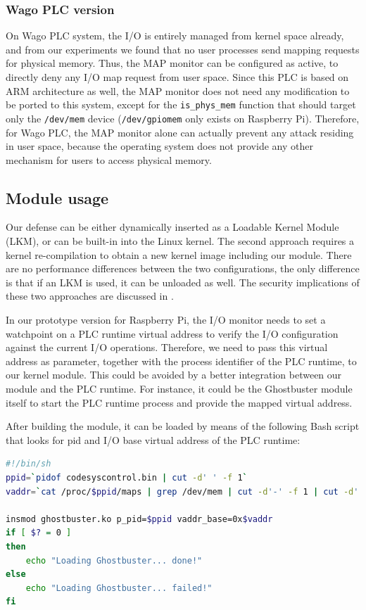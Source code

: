 \subsubsection{Wago PLC version}

On Wago PLC system, the I/O is entirely managed from kernel space already, and from our experiments we found that no user processes send mapping requests for physical memory.
Thus, the MAP monitor can be configured as active, to directly deny any I/O map request from user space.
Since this PLC is based on ARM architecture as well, the MAP monitor does not need any modification to be ported to this system,
except for the \verb|is_phys_mem| function that should target only the \verb|/dev/mem| device (\verb|/dev/gpiomem| only exists on Raspberry Pi).
Therefore, for Wago PLC, the MAP monitor alone can actually prevent any attack residing in user space, because the operating system does not provide
any other mechanism for users to access physical memory.


\subsection{Module usage}
\label{sec:def-usage}

Our defense can be either dynamically inserted as a Loadable Kernel Module (LKM), or can be built-in into the Linux kernel.
The second approach requires a kernel re-compilation to obtain a new kernel image including our module.
There are no performance differences between the two configurations, the only difference is that if an LKM is used, it can be unloaded as well.
The security implications of these two approaches are discussed in .

In our prototype version for Raspberry Pi, the I/O monitor needs to set a watchpoint on a PLC runtime virtual address to verify the I/O configuration
against the current I/O operations. Therefore, we need to pass this virtual address as parameter, together with the process identifier of the PLC runtime, to our kernel module.
This could be avoided by a better integration between our module and the PLC runtime.
For instance, it could be the Ghostbuster module itself to start the PLC runtime process and provide the mapped virtual address.

After building the module, it can be loaded by means of the following Bash script that looks for pid and I/O base virtual address of the PLC runtime:
\begin{lstlisting}[language=bash]
#!/bin/sh
ppid=`pidof codesyscontrol.bin | cut -d' ' -f 1`
vaddr=`cat /proc/$ppid/maps | grep /dev/mem | cut -d'-' -f 1 | cut -d' ' -f 1`

insmod ghostbuster.ko p_pid=$ppid vaddr_base=0x$vaddr
if [ $? = 0 ]
then
	echo "Loading Ghostbuster... done!"
else
	echo "Loading Ghostbuster... failed!"
fi
\end{lstlisting}

